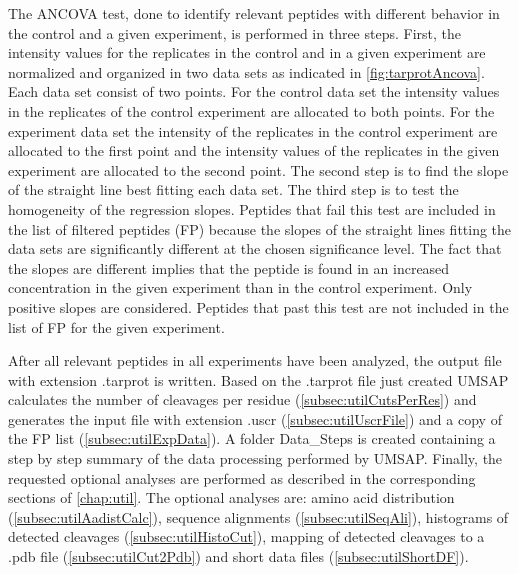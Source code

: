 The ANCOVA test, \label{par:tarprotAncovaTest} done to identify relevant peptides with different behavior in the control and a given experiment, is performed in three steps. First, the intensity values for the replicates in the control and in a given experiment are normalized and organized in two data sets as indicated in \autoref{fig:tarprotAncova}. Each data set consist of two points. For the control data set the intensity values in the replicates of the control experiment are allocated to both points. For the experiment data set the intensity of the replicates in the control experiment are allocated to the first point and the intensity values of the replicates in the given experiment are allocated to the second point. The second step is to find the slope of the straight line best fitting each data set. The third step is to test the homogeneity of the regression slopes. Peptides that fail this test are included in the list of filtered peptides (FP) because the slopes of the straight lines fitting the data sets are significantly different at the chosen significance level. The fact that the slopes are different implies that the peptide is found in an increased concentration in the given experiment than in the control experiment. Only positive slopes are considered. Peptides that past this test are not included in the list of FP for the given experiment. 

After all relevant peptides in all experiments have been analyzed, the output file with extension .tarprot is written. Based on the .tarprot file just created UMSAP calculates the number of cleavages per residue (\autoref{subsec:utilCutsPerRes}) and generates the input file with extension .uscr (\autoref{subsec:utilUscrFile}) and a copy of the FP list (\autoref{subsec:utilExpData}). A folder Data{\_}Steps is created containing a step by step summary of the data processing performed by UMSAP. Finally, the requested optional analyses are performed as described in the corresponding sections of \autoref{chap:util}. The optional analyses are: amino acid distribution (\autoref{subsec:utilAadistCalc}), sequence alignments (\autoref{subsec:utilSeqAli}), histograms of detected cleavages (\autoref{subsec:utilHistoCut}), mapping of detected cleavages to a .pdb file (\autoref{subsec:utilCut2Pdb}) and short data files (\autoref{subsec:utilShortDF}).

